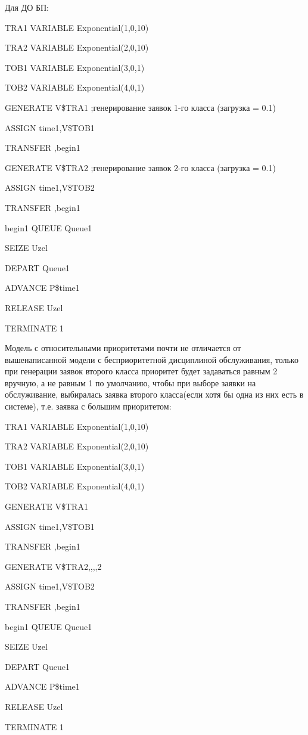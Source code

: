 \documentclass[a4paper,14pt]{report} %
\begin{document}
Для ДО БП:\par\noindent
TRA1	VARIABLE	Exponential(1,0,10) \par\noindent
TRA2	VARIABLE	Exponential(2,0,10) \par\noindent
TOB1	VARIABLE	Exponential(3,0,1) \par\noindent
TOB2	VARIABLE	Exponential(4,0,1)  \par              
GENERATE	V\$TRA1 ;генерирование заявок 1-го класса (загрузка = 0.1)\par 
ASSIGN 	time1,V\$TOB1 \par
TRANSFER ,begin1 \par
GENERATE	V\$TRA2 ;генерирование заявок 2-го класса (загрузка = 0.1)\par 
ASSIGN 	time1,V\$TOB2 \par
TRANSFER ,begin1 \par\noindent
begin1	QUEUE	Queue1 \par
SEIZE 	Uzel \par
DEPART	Queue1 \par
ADVANCE 	P\$time1 \par
RELEASE 	Uzel \par
TERMINATE 1 \par
\vspace{0.5cm} 
Модель с относительными приоритетами почти не отличается от вышенаписанной модели с бесприоритетной дисциплиной обслуживания, только при генерации заявок второго класса приоритет будет задаваться равным 2 вручную, а не равным 1 по умолчанию, чтобы при выборе заявки на обслуживание, выбиралась заявка второго класса(если хотя бы одна из них есть в системе), т.е. заявка с большим приоритетом:\par\noindent
TRA1	VARIABLE	Exponential(1,0,10) \par\noindent
TRA2	VARIABLE	Exponential(2,0,10) \par\noindent
TOB1	VARIABLE	Exponential(3,0,1) \par\noindent
TOB2	VARIABLE	Exponential(4,0,1)  \par              
GENERATE	V\$TRA1 \par 
ASSIGN 	time1,V\$TOB1 \par
TRANSFER ,begin1 \par
GENERATE	V\$TRA2,,,,2 \par 
ASSIGN 	time1,V\$TOB2 \par
TRANSFER ,begin1 \par\noindent
begin1	QUEUE	Queue1 \par
SEIZE 	Uzel \par
DEPART	Queue1 \par
ADVANCE 	P\$time1 \par
RELEASE 	Uzel \par
TERMINATE 1 \par
\end{document}
